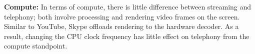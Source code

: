 





\noindent \textbf{Compute:} In terms of compute, there is little difference between streaming and telephony; both involve processing and rendering video frames on the screen. Similar to YouTube, Skype offloads rendering to the hardware decoder. As a result, changing the CPU clock frequency has little effect on telephony from the compute standpoint.
